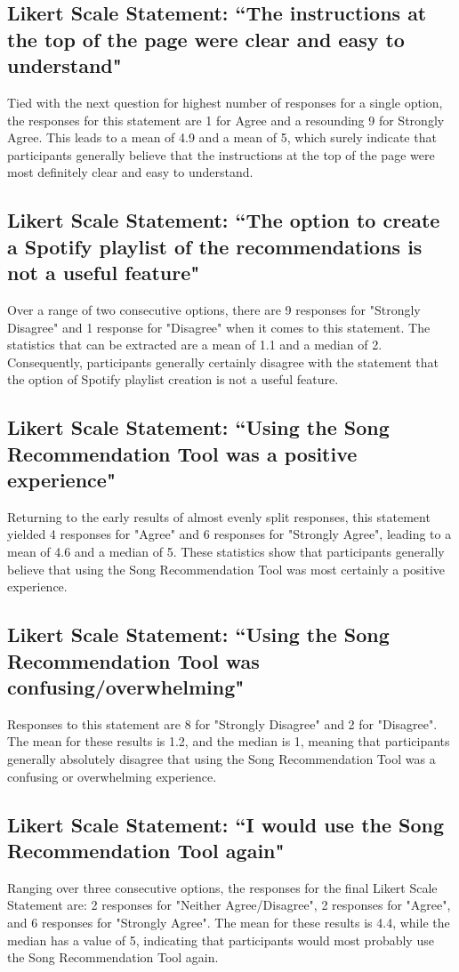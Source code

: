\documentclass{l4proj}
\begin{document}
\subsection{Likert Scale Statement: ``The instructions at the top of the page were clear and easy to understand"}
Tied with the next question for highest number of responses for a single option, the responses for this statement are 1 for Agree and a resounding 9 for Strongly Agree. This leads to a mean of 4.9 and a mean of 5, which surely indicate that participants generally believe that the instructions at the top of the page were most definitely clear and easy to understand.
\subsection{Likert Scale Statement: ``The option to create a Spotify playlist of the recommendations is not a useful feature"}
Over a range of two consecutive options, there are 9 responses for "Strongly Disagree" and 1 response for "Disagree" when it comes to this statement. The statistics that can be extracted are a mean of 1.1 and a median of 2. Consequently, participants generally certainly disagree with the statement that the option of Spotify playlist creation is not a useful feature.
\subsection{Likert Scale Statement: ``Using the Song Recommendation Tool was a positive experience"}
Returning to the early results of almost evenly split responses, this statement yielded 4 responses for "Agree" and 6 responses for "Strongly Agree", leading to a mean of 4.6 and a median of 5. These statistics show that participants generally believe that using the Song Recommendation Tool was most certainly a positive experience.
\subsection{Likert Scale Statement: ``Using the Song Recommendation Tool was confusing/overwhelming"}
Responses to this statement are 8 for "Strongly Disagree" and 2 for "Disagree". The mean for these results is 1.2, and the median is 1, meaning that participants generally absolutely disagree that using the Song Recommendation Tool was a confusing or overwhelming experience.
\subsection{Likert Scale Statement: ``I would use the Song Recommendation Tool again"}
Ranging over three consecutive options, the responses for the final Likert Scale Statement are: 2 responses for "Neither Agree/Disagree", 2 responses for "Agree", and 6 responses for "Strongly Agree". The mean for these results is 4.4, while the median has a value of 5, indicating that participants would most probably use the Song Recommendation Tool again.
\end{document}
